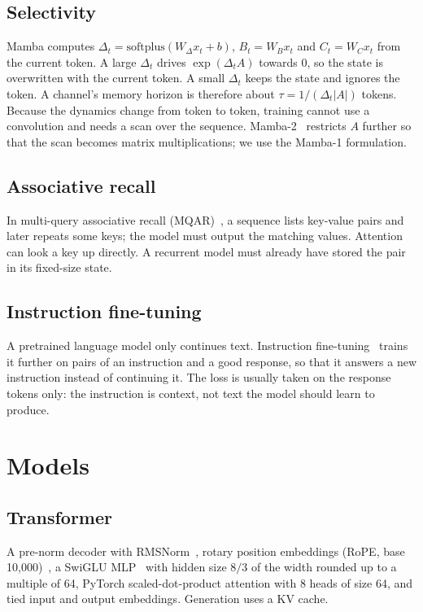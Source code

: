 \documentclass[conference]{IEEEtran}
\begin{document}
\subsection{Selectivity}
Mamba computes $\Delta_t = \mathrm{softplus}(W_\Delta x_t + b)$, $B_t = W_B x_t$ and $C_t = W_C x_t$ from
the current token. A large $\Delta_t$ drives $\exp(\Delta_t A)$ towards 0, so the state is overwritten
with the current token. A small $\Delta_t$ keeps the state and ignores the token. A channel's memory
horizon is therefore about $\tau = 1/(\Delta_t |A|)$ tokens. Because the dynamics change from token to
token, training cannot use a convolution and needs a scan over the sequence. Mamba-2~\cite{dao2024mamba2}
restricts $A$ further so that the scan becomes matrix multiplications; we use the Mamba-1 formulation.

\subsection{Associative recall}
In multi-query associative recall (MQAR)~\cite{arora2023zoology}, a sequence lists key-value pairs and
later repeats some keys; the model must output the matching values. Attention can look a key up
directly. A recurrent model must already have stored the pair in its fixed-size state.

\subsection{Instruction fine-tuning}
A pretrained language model only continues text. Instruction fine-tuning~\cite{wei2022flan} trains it
further on pairs of an instruction and a good response, so that it answers a new instruction instead of
continuing it. The loss is usually taken on the response tokens only: the instruction is context, not
text the model should learn to produce.

\section{Models}

\subsection{Transformer}
A pre-norm decoder with RMSNorm~\cite{zhang2019rmsnorm}, rotary position embeddings
(RoPE, base 10,000)~\cite{su2021roformer}, a SwiGLU MLP~\cite{shazeer2020glu} with hidden size $8/3$ of
the width rounded up to a multiple of 64, PyTorch scaled-dot-product attention with 8 heads of size 64,
and tied input and output embeddings. Generation uses a KV cache.
\end{document}
